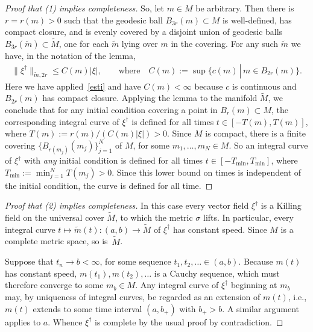 \documentclass[pdftex]{sigma}
\newcommand\suchthat{\,\left\vert\right.\, }
\renewcommand{\le}{\leqslant} \renewcommand{\ge}{\geqslant}
\numberwithin{equation}{section}
\begin{document}
\begin{proof}[Proof that (1) implies completeness]
  So, let $m\in M$ be arbitrary. Then there is $r=r(m)>0$ such that
  the geodesic ball $B_{3r}(m)\subset M$ is well-def\/ined, has compact
  closure, and is evenly covered by a disjoint union of geodesic balls
  $B_{3r}(\tilde m) \subset \tilde M$, one for each $\tilde m$ lying
  over $m$ in the covering. For any such $\tilde m$ we have, in the
  notation of the lemma,
  \begin{gather*}
    \|\xi^\dagger\|_{\tilde m,2r}\le C(m)|\xi|,\qquad\text{where}\quad C(m):=\sup\{c(m)\suchthat m\in B_{2r}(m)\}.
  \end{gather*}
  Here we have applied~\eqref{esti} and have $C(m)<\infty$ because $c$
  is continuous and $B_{2r}(m)$ has compact closure. Applying the
  lemma to the manifold $\tilde M$, we conclude that for any initial
  condition covering a point in $B_r(m)\subset M$, the corresponding
  integral curve of $\xi^\dagger$ is def\/ined for all times $t\in
  [-T(m),T(m)]$, where $T(m):=r(m)/(C(m)|\xi|)>0$. Since $M$ is
  compact, there is a f\/inite covering $\{B_{r(m_j)}(m_j)\}_{j=1}^N$ of
  $M$, for some $m_1,\ldots, m_N\in M$. So an integral curve of
  $\xi^\dagger$ with {\em any} initial condition is def\/ined for all
  times $t\in[-T_\mathrm{min},T_\mathrm{min}]$, where
  $T_\mathrm{min}:=\min_{j=1}^N T(m_j)>0$. Since this lower bound on
  times is independent of the initial condition, the curve is def\/ined
  for all time.
\end{proof}

\begin{proof}[Proof that (2) implies completeness]
  In this case every vector f\/ield $\xi^\dagger$ is a Killing f\/ield on
the universal cover $\tilde M$, to which the metric $\sigma $
  lifts. In particular, every integral curve $t \mapsto \tilde m(t)
  \colon (a,b) \rightarrow \tilde M $ of $\xi^\dagger$ has constant
  speed. Since $M$ is a complete metric space, so is~$\tilde M$.

  Suppose that $t_n \rightarrow b<\infty$, for some sequence $t_1,
  t_2, \ldots \in (a,b)$. Because $m(t)$ has constant speed, $m(t_1),
  m(t_2), \ldots$ is a Cauchy sequence, which must therefore converge
  to some $m_b\in M$. Any integral curve of $\xi^\dagger$ beginning at
  $m_b$ may, by uniqueness of integral curves, be regarded as an
  extension of $m(t)$, i.e., $m(t)$ extends to some time interval
  $(a,b_+)$ with $b_+>b$. A similar argument applies to $a$. Whence
  $\xi^\dagger$ is complete by the usual proof by contradiction.
\end{proof}
\end{document}

